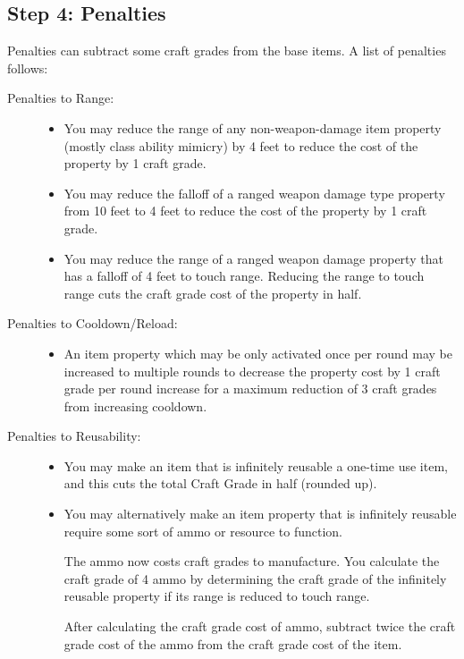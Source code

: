 \subsection{Step 4: Penalties}
Penalties can subtract some craft grades from the base items. A list of penalties follows:
\begin{description}
	\item[Penalties to Range:] \hfill
	\begin{itemize}
		\item You may reduce the range of any non-weapon-damage item property (mostly class ability mimicry) by 4 feet to reduce the cost of the property by 1 craft grade.
		\item You may reduce the falloff of a ranged weapon damage type property from 10 feet to 4 feet to reduce the cost of the property by 1 craft grade.
		\item You may reduce the range of a ranged weapon damage property that has a falloff of 4 feet to touch range. Reducing the range to touch range cuts the craft grade cost of the property in half.
	\end{itemize}
	\item[Penalties to Cooldown/Reload:] \hfill
	\begin{itemize}
		\item An item property which may be only activated once per round may be increased to multiple rounds to decrease the property cost by 1 craft grade per round increase for a maximum reduction of 3 craft grades from increasing cooldown.
	\end{itemize}
	\item[Penalties to Reusability:] \hfill
	\begin{itemize}
		\item You may make an item that is infinitely reusable a one-time use item, and this cuts the total Craft Grade in half (rounded up).
		\item You may alternatively make an item property that is infinitely reusable require some sort of ammo or resource to function.
		
		The ammo now costs craft grades to manufacture. You calculate the craft grade of 4 ammo by determining the craft grade of the infinitely reusable property if its range is reduced to touch range.
		
		After calculating the craft grade cost of ammo, subtract twice the craft grade cost of the ammo from the craft grade cost of the item.
		

\end{itemize}
\end{description}
